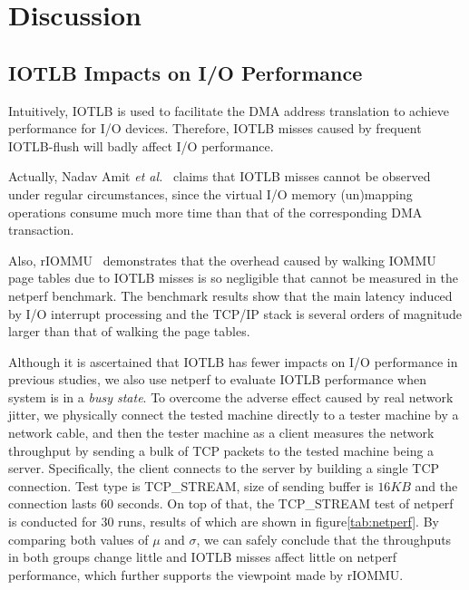 \section{Discussion} \label{sec:dis}
\subsection{IOTLB Impacts on I/O Performance}

Intuitively, IOTLB is used to facilitate the DMA address translation to achieve performance for I/O devices. Therefore, IOTLB misses caused by frequent IOTLB-flush will badly affect I/O performance.

Actually, Nadav Amit \emph{et al.}~\cite{amit2012iommu} claims that IOTLB misses cannot be observed under regular circumstances, since the virtual I/O memory (un)mapping operations consume much more time than that of the corresponding DMA transaction.

Also, rIOMMU~\cite{malka2015riommu} demonstrates that the overhead caused by walking IOMMU page tables due to IOTLB misses is so negligible that cannot be measured in the netperf benchmark. The benchmark results show that the main latency induced by I/O interrupt processing and the TCP/IP stack is several orders of magnitude larger than that of walking the page tables.

Although it is ascertained that IOTLB has fewer impacts on I/O performance in previous studies, we also use netperf to evaluate IOTLB performance when system is in a \emph{busy state}. To overcome the adverse effect caused by real network jitter, we physically connect the tested machine directly to a tester machine by a network cable, and then the tester machine as a client measures the network throughput by sending a bulk of TCP packets to the tested machine being a server.
Specifically, the client connects to the server by building a single TCP connection. Test type is TCP\_STREAM, size of sending buffer is $16KB$ and the connection lasts $60$ seconds. On top of that, the TCP\_STREAM test of netperf is conducted for $30$ runs, results of which are shown in figure\ref{tab:netperf}. By comparing both values of $\mu$ and $\sigma$, we can safely conclude that the throughputs in both groups change little and IOTLB misses affect little on netperf performance, which further supports the viewpoint made by rIOMMU.


